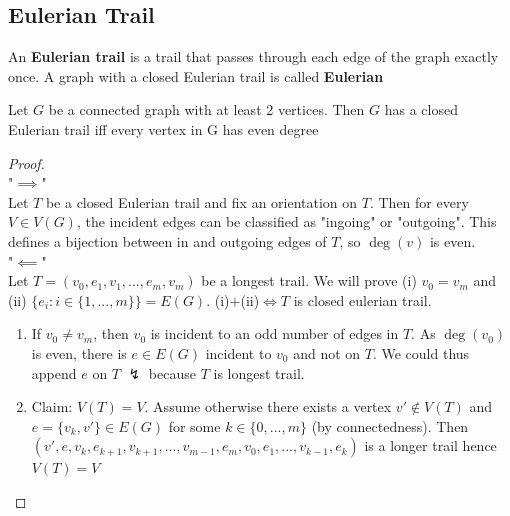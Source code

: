 \subsection{Eulerian Trail}

\begin{definition}
    An \textbf{Eulerian trail} is a trail that passes through each edge of the graph exactly once. A graph with a closed Eulerian trail is called \textbf{Eulerian}
\end{definition}
\vspace{0.5cm}
\begin{theorem}
    Let $G$ be a connected graph with at least 2 vertices. Then $G$ has a closed Eulerian trail iff every vertex in G has even degree
\end{theorem}
\begin{proof}
\hfill \\
    "$\implies$" \\
    Let $T$ be a closed Eulerian trail and fix an orientation on $T$. Then for every $V\in V(G)$, the incident edges can be classified as "ingoing" or "outgoing". This defines a bijection between in and outgoing edges of $T$, so $\deg(v)$ is even.\\
    "$\impliedby$" \\
    Let $T=(v_0,e_1,v_1,...,e_m,v_m)$ be a longest trail. We will prove (i) $v_0=v_m$ and (ii) $\{e_i:i\in \{1,...,m\}\}=E(G)$. (i)$+$(ii)$\iff T$ is closed eulerian trail.\\
    \begin{enumerate}
        \item If $v_0\neq v_m$, then $v_0$ is incident to an odd number of edges in $T$. As $\deg(v_0)$ is even, there is $e\in E(G)$ incident to $v_0$ and not on $T$. We could thus append $e$ on $T$ $\lightning$ because $T$ is longest trail.
        \item Claim: $V(T)=V$. Assume otherwise there exists a vertex $v'\notin V(T)$ and $e=\{v_k,v'\}\in E(G)$ for some $k\in \{0,...,m\}$ (by connectedness). Then $(v',e,v_k,e_{k+1},v_{k+1},...,v_{m-1},e_m,v_0,e_1,...,v_{k-1},e_k)$ is a longer trail hence $V(T)=V$
        \begin{center}
\end{center}
\end{enumerate}
\end{proof}
